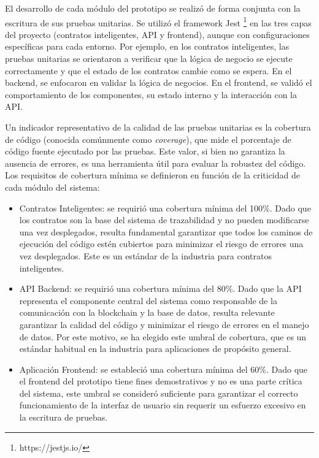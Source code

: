 El desarrollo de cada módulo del prototipo se realizó de forma conjunta con la escritura de sus pruebas unitarias. Se utilizó el framework Jest \footnote{https://jestjs.io/} en las tres capas del proyecto (contratos inteligentes, API y frontend), aunque con configuraciones específicas para cada entorno. Por ejemplo, en los contratos inteligentes, las pruebas unitarias se orientaron a verificar que la lógica de negocio se ejecute correctamente y que el estado de los contratos cambie como se espera. En el backend, se enfocaron en validar la lógica de negocios. En el frontend, se validó el comportamiento de los componentes, su estado interno y la interacción con la API.

Un indicador representativo de la calidad de las pruebas unitarias es la cobertura de código (conocida comúnmente como \textit{coverage}), que mide el porcentaje de código fuente ejecutado por las pruebas. Este valor, si bien no garantiza la ausencia de errores, es una herramienta útil para evaluar la robustez del código. Los requisitos de cobertura mínima se definieron en función de la criticidad de cada módulo del sistema:

\begin{itemize}
\item Contratos Inteligentes: se requirió una cobertura mínima del 100\%. Dado que los contratos son la base del sistema de trazabilidad y no pueden modificarse una vez desplegados, resulta fundamental garantizar que todos los caminos de ejecución del código estén cubiertos para minimizar el riesgo de errores una vez desplegados. Este es un estándar de la industria para contratos inteligentes.
\item API Backend: se requirió una cobertura mínima del 80\%. Dado que la API representa el componente central del sistema como responsable de la comunicación con la blockchain y la base de datos, resulta relevante garantizar la calidad del código y minimizar el riesgo de errores en el manejo de datos. Por este motivo, se ha elegido este umbral de cobertura, que es un estándar habitual en la industria para aplicaciones de propósito general.
\item Aplicación Frontend: se estableció una cobertura mínima del 60\%. Dado que el frontend del prototipo tiene fines demostrativos y no es una parte crítica del sistema, este umbral se consideró suficiente para garantizar el correcto funcionamiento de la interfaz de usuario sin requerir un esfuerzo excesivo en la escritura de pruebas.
\end{itemize}

